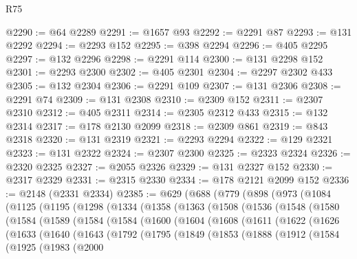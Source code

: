 \begin{lexlean}{R75}
\begin{coremodule}
@2290 := @64 @2289
@2291 := @1657 @93
@2292 := @2291 @87
@2293 := @131 @2292
@2294 := @2293 @152
@2295 := @398 @2294
@2296 := @405 @2295
@2297 := @132 @2296
@2298 := @2291 @114
@2300 := @131 @2298 @152
@2301 := @2293 @2300
@2302 := @405 @2301
@2304 := @2297 @2302 @433
@2305 := @132 @2304
@2306 := @2291 @109
@2307 := @131 @2306
@2308 := @2291 @74
@2309 := @131 @2308
@2310 := @2309 @152
@2311 := @2307 @2310
@2312 := @405 @2311
@2314 := @2305 @2312 @433
@2315 := @132 @2314
@2317 := @178 @2130 @2099
@2318 := @2309 @861
@2319 := @843 @2318
@2320 := @131 @2319
@2321 := @2293 @2294
@2322 := @129 @2321
@2323 := @131 @2322
@2324 := @2307 @2300
@2325 := @2323 @2324
@2326 := @2320 @2325
@2327 := @2055 @2326
@2329 := @131 @2327 @152
@2330 := @2317 @2329
@2331 := @2315 @2330
@2334 := @178 @2121 @2099 @152
@2336 := @2148 (@2331 @2334)
@2385 := @629
    (@688
      (@779
        (@898
          (@973
            (@1084
              (@1125
                (@1195
                  (@1298
                    (@1334
                      (@1358
                        (@1363
                          (@1508
                            (@1536
                              (@1548
                                (@1580
                                  (@1584
                                    (@1589
                                      (@1584
                                        (@1584
                                          (@1600
                                            (@1604
                                              (@1608
                                                (@1611
                                                  (@1622
                                                    (@1626
                                                      (@1633
                                                        (@1640
                                                          (@1643
                                                            (@1792
                                                              (@1795
                                                                (@1849
                                                                  (@1853
                                                                    (@1888
                                                                      (@1912
                                                                        (@1584
                                                                          (@1925
                                                                            (@1983
                                                                              (@2000

\end{coremodule}
\end{lexlean}
